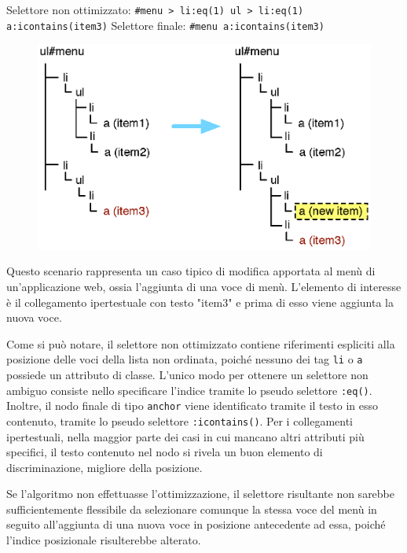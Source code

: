 Selettore non ottimizzato:  \verb|#menu > li:eq(1) ul > li:eq(1) a:icontains(item3)| 
\newline
Selettore finale:  \verb|#menu a:icontains(item3)| 

\begin{figure}[htbp]
\begin{center}
\includegraphics[width=\textwidth]{images/dom_examples/menu_add_item.eps}
\end{center}
\end{figure}

Questo scenario rappresenta un caso tipico di modifica apportata al menù di un'applicazione web, ossia l'aggiunta di una voce di menù. L'elemento di interesse è il collegamento ipertestuale con testo "item3" e prima di esso viene aggiunta la nuova voce. 

Come si può notare, il selettore non ottimizzato contiene riferimenti espliciti alla posizione delle voci della lista non ordinata, poiché nessuno dei tag \verb|li| o \verb|a| possiede un attributo di classe. L'unico modo per ottenere un selettore non ambiguo consiste nello specificare l'indice tramite lo pseudo selettore \verb|:eq()|. Inoltre, il nodo finale di tipo \verb|anchor| viene identificato tramite il testo in esso contenuto, tramite lo pseudo selettore \verb|:icontains()|. Per i collegamenti ipertestuali, nella maggior parte dei casi in cui mancano altri attributi più specifici, il testo contenuto nel nodo si rivela un buon elemento di discriminazione, migliore della posizione.

Se l'algoritmo non effettuasse l'ottimizzazione, il selettore risultante non sarebbe sufficientemente flessibile da selezionare comunque la stessa voce del menù in seguito all'aggiunta di una nuova voce in posizione antecedente ad essa, poiché l'indice posizionale risulterebbe alterato.

